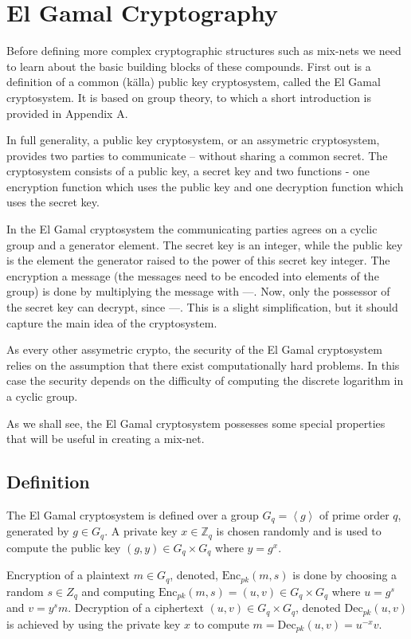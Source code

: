 \section{El Gamal Cryptography}

Before defining more complex cryptographic structures such as mix-nets
we need to learn about the basic building blocks of these
compounds. First out is a definition of a common (källa) public key
cryptosystem, called the El Gamal cryptosystem. It is based on group
theory, to which a short introduction is provided in Appendix A. 

In full generality, a public key cryptosystem, or an assymetric
cryptosystem, provides two parties to communicate -- without sharing a
common secret. The cryptosystem consists of a public key, a secret key
and two functions - one encryption function which uses the public key
and one decryption function which uses the secret key.

In the El Gamal cryptosystem the communicating parties agrees on a
cyclic group and a generator element. The secret key is an integer,
while the public key is the element the generator raised to the power
of this secret key integer. The encryption a message (the messages
need to be encoded into elements of the group) is done by multiplying
the message with ---. Now, only the possessor of the secret key can
decrypt, since ---. This is a slight simplification, but it should
capture the main idea of the cryptosystem.

As every other assymetric crypto, the security of the El Gamal
cryptosystem relies on the assumption that there exist computationally
hard problems. In this case the security depends on the difficulty of
computing the discrete logarithm in a cyclic group.

As we shall see, the El Gamal cryptosystem possesses some special
properties that will be useful in creating a mix-net.

\subsection{Definition}
The El Gamal cryptosystem is defined over a group $G_q =
\left<g\right>$ of prime order $q$, generated by $g \in G_q$. A
private key $x \in \mathbb{Z}_q$ is chosen randomly and is used to
compute the public key $(g,y) \in G_q \times G_q$ where $y =
g^x$. 

Encryption of a plaintext $m \in G_q$, denoted,
$\mathrm{Enc}_{pk}(m,s)$ is done by choosing a random $s \in Z_q$ and
computing $ \mathrm{Enc}_{pk}(m,s) = (u,v) \in G_q \times G_q$ where
$u = g^s$ and $v = y^sm$. Decryption of a ciphertext $(u,v) \in G_q
\times G_q$, denoted $\mathrm{Dec}_{pk}(u,v)$ is achieved by using the
private key $x$ to compute $m = \mathrm{Dec}_{pk}(u,v) = u^{-x}v$.

